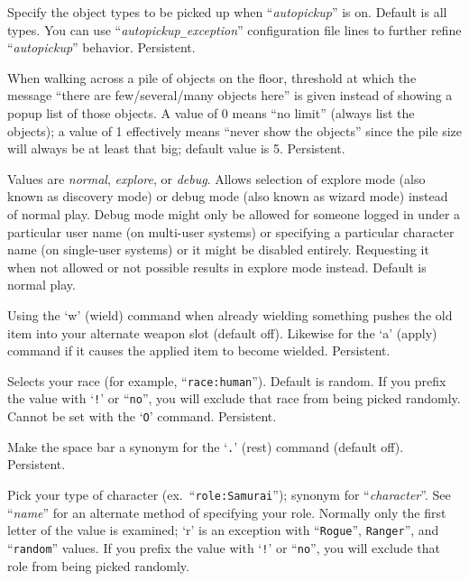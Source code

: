 \item[\ib{pickup\verb+_+types}]
Specify the object types to be picked up when ``{\it autopickup\/}'' 
is on.  Default is all types.  You can use ``{\it autopickup\verb+_+exception\/}''
configuration file lines to further refine ``{\it autopickup\/}'' behavior.
Persistent.
\item[\ib{pile\verb+_+limit}]
When walking across a pile of objects on the floor, threshold at which
the message ``there are few/several/many objects here'' is given instead
of showing a popup list of those objects.  A value of 0 means ``no limit''
(always list the objects); a value of 1 effectively means ``never show
the objects'' since the pile size will always be at least that big;
default value is 5.  Persistent.
\item[\ib{playmode}]
Values are {\it normal\/}, {\it explore\/}, or {\it debug\/}.
Allows selection of explore mode (also known as discovery mode) or debug
mode (also known as wizard mode) instead of normal play.
Debug mode might only be allowed for someone logged in under a particular
user name (on multi-user systems) or specifying a particular character
name (on single-user systems) or it might be disabled entirely.  Requesting
it when not allowed or not possible results in explore mode instead.
Default is normal play.
\item[\ib{pushweapon}]
Using the `w' (wield) command when already wielding
something pushes the old item into your alternate weapon slot (default off).
Likewise for the `a' (apply) command if it causes the applied item to
become wielded.  Persistent.
\item[\ib{race}]
Selects your race (for example, ``{\tt race:human}'').  Default is random.
If you prefix the value with `{\tt !}' or ``{\tt no}'', you will
exclude that race from being picked randomly. 
Cannot be set with the `{\tt O}' command.  Persistent.
\item[\ib{rest\verb+_+on\verb+_+space}]
Make the space bar a synonym for the `{\tt .}' (rest) command (default off).
Persistent.
\item[\ib{role}]
Pick your type of character (ex.\ ``{\tt role:Samurai}'');
synonym for ``{\it character\/}''.  See ``{\it name\/}'' for an alternate method
of specifying your role.  Normally only the first letter of the
value is examined; `r' is an exception with ``{\tt Rogue}'', {\tt Ranger}'',
and ``{\tt random}'' values.
If you prefix the value with `{\tt !}' or ``{\tt no}'', you will
exclude that role from being picked randomly.
